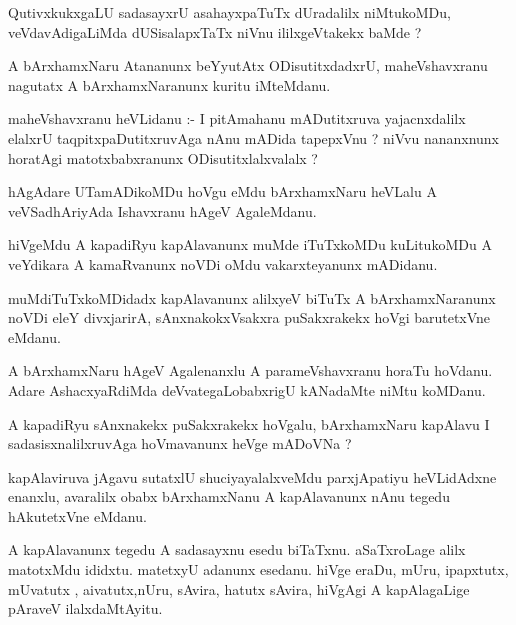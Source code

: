 \documentclass{article}
\begin{document}
\begin{mn}
QutivxkukxgaLU sadasayxrU asahayxpaTuTx  dUradalilx  niMtukoMDu, veVdavAdigaLiMda  
dUSisalapxTaTx  niVnu  ililxgeVtakekx baMde ?
\end{mn}

\begin{mn}
A bArxhamxNaru Atananunx  beYyutAtx  ODisutitxdadxrU, maheVshavxranu nagutatx 
A bArxhamxNaranunx  kuritu iMteMdanu.
\end{mn}

\begin{mn}
maheVshavxranu  heVLidanu :- I pitAmahanu  mADutitxruva  yajacnxdalilx  elalxrU  taqpitxpaDutitxruvAga  
nAnu  mADida  tapepxVnu ?  niVvu nananxnunx horatAgi matotxbabxranunx  ODisutitxlalxvalalx ? 
\end{mn}

\begin{mn}
hAgAdare  UTamADikoMDu  hoVgu  eMdu bArxhamxNaru heVLalu  A veVSadhAriyAda  Ishavxranu  hAgeV AgaleMdanu. 
\end{mn}

\begin{mn}
hiVgeMdu A kapadiRyu  kapAlavanunx  muMde  iTuTxkoMDu  kuLitukoMDu  A  veYdikara 
A kamaRvanunx  noVDi  oMdu  vakarxteyanunx mADidanu.
\end{mn}

\begin{mn}
muMdiTuTxkoMDidadx kapAlavanunx alilxyeV biTuTx A bArxhamxNaranunx  noVDi  eleY divxjarirA, 
sAnxnakokxVsakxra puSakxrakekx  hoVgi  barutetxVne eMdanu.
\end{mn}

\begin{mn}
A bArxhamxNaru hAgeV Agalenanxlu  A  parameVshavxranu  horaTu hoVdanu.  Adare  
AshacxyaRdiMda  deVvategaLobabxrigU  kANadaMte  niMtu  koMDanu.
\end{mn}

\begin{mn}
A kapadiRyu  sAnxnakekx puSakxrakekx  hoVgalu, bArxhamxNaru kapAlavu  I  
sadasisxnalilxruvAga  hoVmavanunx heVge mADoVNa ?
\end{mn}

\begin{mn}
kapAlaviruva jAgavu sutatxlU shuciyayalalxveMdu parxjApatiyu heVLidAdxne enanxlu, 
avaralilx obabx bArxhamxNanu A kapAlavanunx nAnu tegedu hAkutetxVne eMdanu. 
\end{mn}

\begin{mn}
A kapAlavanunx tegedu A sadasayxnu esedu biTaTxnu.  aSaTxroLage alilx matotxMdu  
ididxtu.  matetxyU adanunx  esedanu.  hiVge eraDu, mUru, ipapxtutx, mUvatutx , 
aivatutx,nUru, sAvira, hatutx sAvira, hiVgAgi A kapAlagaLige pAraveV ilalxdaMtAyitu.
\end{mn}
\end{document}
